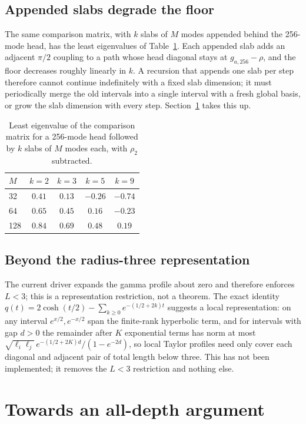 \documentclass[11pt]{article}
\numberwithin{equation}{section}
\theoremstyle{definition}
\theoremstyle{remark}
\begin{document}
\subsection{Appended slabs degrade the floor}
The same comparison matrix, with $k$ slabs of $M$ modes appended behind the 256-mode head, has the least eigenvalues of Table~\ref{tab:chain}. Each appended slab adds an adjacent $\pi/2$ coupling to a path whose head diagonal stays at $g_{a,256}-\rho$, and the floor decreases roughly linearly in $k$. A recursion that appends one slab per step therefore cannot continue indefinitely with a fixed slab dimension; it must periodically merge the old intervals into a single interval with a fresh global basis, or grow the slab dimension with every step. Section~\ref{sec:alldepth} takes this up.

\begin{table}[t]\centering\small
\caption{Least eigenvalue of the comparison matrix for a 256-mode head followed by $k$ slabs of $M$ modes each, with $\rho_2$ subtracted.}\label{tab:chain}
\begin{tabular}{@{}lcccc@{}}\toprule
$M$ & $k=2$ & $k=3$ & $k=5$ & $k=9$\\\midrule
32 & $0.41$ & $0.13$ & $-0.26$ & $-0.74$\\
64 & $0.65$ & $0.45$ & $0.16$ & $-0.23$\\
128 & $0.84$ & $0.69$ & $0.48$ & $0.19$\\\bottomrule
\end{tabular}
\end{table}

\subsection{Beyond the radius-three representation}
The current driver expands the gamma profile about zero and therefore enforces $L<3$; this is a representation restriction, not a theorem. The exact identity $q(t)=2\cosh(t/2)-\sum_{k\ge0}e^{-(1/2+2k)t}$ suggests a local representation: on any interval $e^{x/2},e^{-x/2}$ span the finite-rank hyperbolic term, and for intervals with gap $d>0$ the remainder after $K$ exponential terms has norm at most $\sqrt{\ell_i\ell_j}\,e^{-(1/2+2K)d}/(1-e^{-2d})$, so local Taylor profiles need only cover each diagonal and adjacent pair of total length below three. This has not been implemented; it removes the $L<3$ restriction and nothing else.

\section{Towards an all-depth argument}\label{sec:alldepth}
\end{document}
